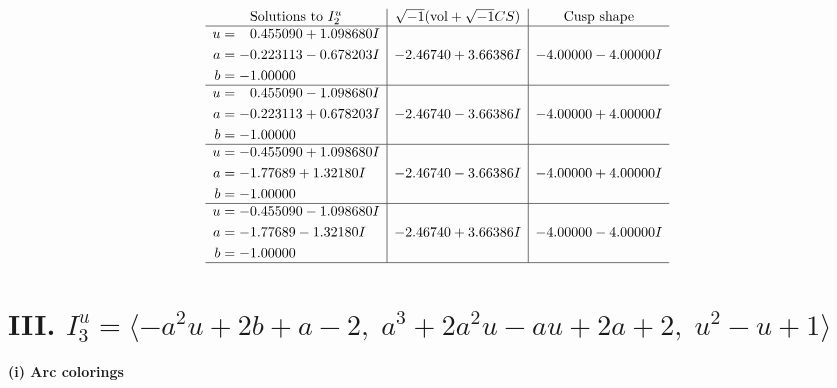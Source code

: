 \documentclass[1p]{elsarticle_modified}
\theoremstyle{definition}
\newcommand{\I}{\sqrt{-1}}
\begin{document}
$$\begin{array}{c|c|c}  
\text{Solutions to }I^u_{2}& \I (\text{vol} + \sqrt{-1}CS) & \text{Cusp shape}\\
 \hline 
\begin{aligned}
u &= \phantom{-}0.455090 + 1.098680 I \\
a &= -0.223113 - 0.678203 I \\
b &= -1.00000\phantom{ +0.000000I}\end{aligned}
 & -2.46740 + 3.66386 I & -4.00000 - 4.00000 I \\ \hline\begin{aligned}
u &= \phantom{-}0.455090 - 1.098680 I \\
a &= -0.223113 + 0.678203 I \\
b &= -1.00000\phantom{ +0.000000I}\end{aligned}
 & -2.46740 - 3.66386 I & -4.00000 + 4.00000 I \\ \hline\begin{aligned}
u &= -0.455090 + 1.098680 I \\
a &= -1.77689 + 1.32180 I \\
b &= -1.00000\phantom{ +0.000000I}\end{aligned}
 & -2.46740 - 3.66386 I & -4.00000 + 4.00000 I \\ \hline\begin{aligned}
u &= -0.455090 - 1.098680 I \\
a &= -1.77689 - 1.32180 I \\
b &= -1.00000\phantom{ +0.000000I}\end{aligned}
 & -2.46740 + 3.66386 I & -4.00000 - 4.00000 I\\
 \hline 
 \end{array}$$\newpage\newpage\renewcommand{\arraystretch}{1}
\centering \section*{III. $I^u_{3}= \langle - a^2 u+2 b+a-2,\;a^3+2 a^2 u- a u+2 a+2,\;u^2- u+1 \rangle$}
\flushleft \textbf{(i) Arc colorings}\\
\end{document}
